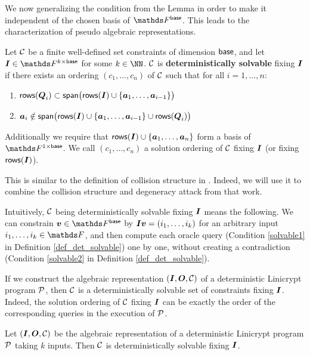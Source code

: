 We now generalizing the condition from the Lemma in order to make it independent of the chosen basis of $\Fsp$.
This leads to the characterization of pseudo algebraic representations.

\begin{defn}
\label{def_det_solvable}
    Let $\C$ be a finite well-defined set constraints of dimension $\base$,
    and let $\I \in \F^{k \times \base}$ for some $k \in \NN$.
    $\C$ is \textbf{deterministically solvable} fixing $\I$
    if there exists an ordering $(c_1, \dots, c_n)$ of $\C$
    such that for all $i=1, \dots, n$:
    \begin{enumerate}
    \item
        \label{solvable1}
        $\rows(\Q_i) \subset \spn \big(\rows(\I) \cup \{\va_1, \dots, \va_{i-1}\}\big)$
    \item
        \label{solvable2}
        $\va_i \notin \spn \big(\rows(\I) \cup \{\va_1, \dots, \va_{i-1}\} \cup \rows(\Q_i) \big)$
    \end{enumerate}
    Additionally we require that $\rows(\I) \cup \{\va_1, \dots, \va_n\}$ form a basis of $\F^{1\times\base}$.
    We call $(c_1, \dots, c_n)$ a solution ordering of $\C$ fixing $\I$ (or fixing $\rows(\I)$).
\end{defn}

This is similar to the definition of collision structure in \cite{TCC:McQSwoRos19}.
Indeed, we will use it to combine the collision structure and degeneracy attack from that work.

Intuitively, $\C$ being deterministically solvable fixing $\I$ means the following.
We can constrain $\vv \in \Fsp$ by $\Inp \vv = (i_1, \dots, i_k)$ for an arbitrary input $i_1, \dots, i_k \in \F$,
and then compute each oracle query (Condition \ref{solvable1} in Definition \ref{def_det_solvable}) one by one,
without creating a contradiction (Condition \ref{solvable2} in Definition \ref{def_det_solvable}).


If we construct the algebraic representation $(\I, \O, \C)$ of a deterministic Linicrypt program $\P$,
then $\C$ is a deterministically solvable set of constraints fixing $\I$.
Indeed, the solution ordering of $\C$ fixing $\I$
can be exactly the order of the corresponding queries in the execution of $\P$.

\begin{lemma}
    Let $(\I, \O, \C)$ be the algebraic representation of a deterministic Linicrypt program $\P$ taking $k$ inputs.
    Then $\C$ is deterministically solvable fixing $\I$.
\end{lemma}

